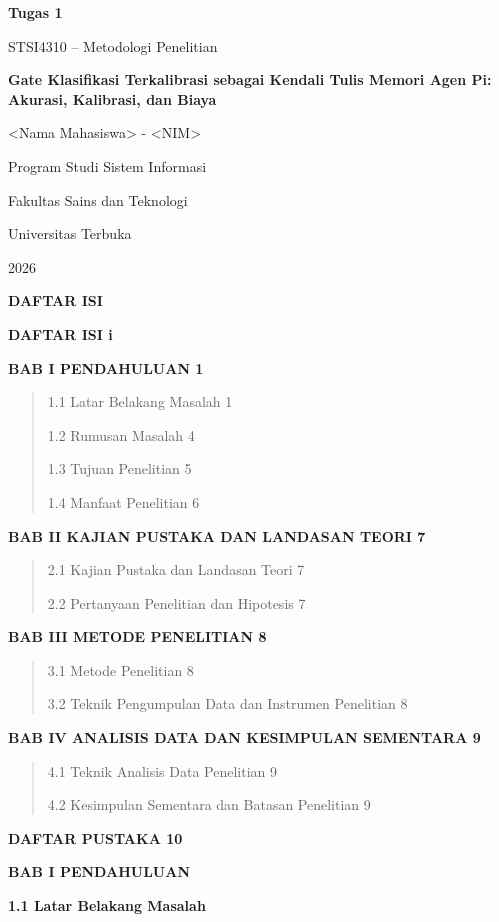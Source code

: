 \documentclass[
]{article}
\author{}
\date{}
\begin{document}
\textbf{Tugas 1}

STSI4310 -- Metodologi Penelitian

\textbf{Gate Klasifikasi Terkalibrasi sebagai Kendali Tulis Memori Agen
Pi: Akurasi, Kalibrasi, dan Biaya}

\textless Nama Mahasiswa\textgreater{} - \textless NIM\textgreater{}

Program Studi Sistem Informasi

Fakultas Sains dan Teknologi

Universitas Terbuka

2026

\textbf{DAFTAR ISI}

\textbf{DAFTAR ISI i}

\textbf{BAB I PENDAHULUAN 1}

\begin{quote}
1.1 Latar Belakang Masalah 1

1.2 Rumusan Masalah 4

1.3 Tujuan Penelitian 5

1.4 Manfaat Penelitian 6
\end{quote}

\textbf{BAB II KAJIAN PUSTAKA DAN LANDASAN TEORI 7}

\begin{quote}
2.1 Kajian Pustaka dan Landasan Teori 7

2.2 Pertanyaan Penelitian dan Hipotesis 7
\end{quote}

\textbf{BAB III METODE PENELITIAN 8}

\begin{quote}
3.1 Metode Penelitian 8

3.2 Teknik Pengumpulan Data dan Instrumen Penelitian 8
\end{quote}

\textbf{BAB IV ANALISIS DATA DAN KESIMPULAN SEMENTARA 9}

\begin{quote}
4.1 Teknik Analisis Data Penelitian 9

4.2 Kesimpulan Sementara dan Batasan Penelitian 9
\end{quote}

\textbf{DAFTAR PUSTAKA 10}

\textbf{BAB I PENDAHULUAN}

\textbf{1.1 Latar Belakang Masalah}
\end{document}
